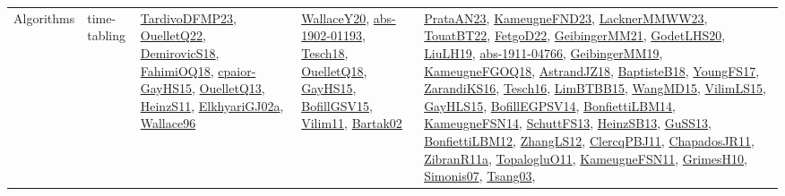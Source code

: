 {\begin{longtable}{lp{3cm}>{\raggedright}p{6cm}>{\raggedright}p{6cm}p{8cm}}
Algorithms & time-tabling & \href{papers/TardivoDFMP23.pdf}{TardivoDFMP23}\cite{TardivoDFMP23}, \href{papers/OuelletQ22.pdf}{OuelletQ22}\cite{OuelletQ22}, \href{papers/DemirovicS18.pdf}{DemirovicS18}\cite{DemirovicS18}, \href{articles/FahimiOQ18.pdf}{FahimiOQ18}\cite{FahimiOQ18}, \href{papers/cpaior-GayHS15.pdf}{cpaior-GayHS15}\cite{cpaior-GayHS15}, \href{papers/OuelletQ13.pdf}{OuelletQ13}\cite{OuelletQ13}, \href{papers/HeinzS11.pdf}{HeinzS11}\cite{HeinzS11}, \href{papers/ElkhyariGJ02a.pdf}{ElkhyariGJ02a}\cite{ElkhyariGJ02a}, \href{articles/Wallace96.pdf}{Wallace96}\cite{Wallace96} & \href{articles/WallaceY20.pdf}{WallaceY20}\cite{WallaceY20}, \href{articles/abs-1902-01193.pdf}{abs-1902-01193}\cite{abs-1902-01193}, \href{papers/Tesch18.pdf}{Tesch18}\cite{Tesch18}, \href{papers/OuelletQ18.pdf}{OuelletQ18}\cite{OuelletQ18}, \href{papers/GayHS15.pdf}{GayHS15}\cite{GayHS15}, \href{papers/BofillGSV15.pdf}{BofillGSV15}\cite{BofillGSV15}, \href{papers/Vilim11.pdf}{Vilim11}\cite{Vilim11}, \href{papers/Bartak02.pdf}{Bartak02}\cite{Bartak02} & \href{articles/PrataAN23.pdf}{PrataAN23}\cite{PrataAN23}, \href{papers/KameugneFND23.pdf}{KameugneFND23}\cite{KameugneFND23}, \href{articles/LacknerMMWW23.pdf}{LacknerMMWW23}\cite{LacknerMMWW23}, \href{papers/TouatBT22.pdf}{TouatBT22}\cite{TouatBT22}, \href{articles/FetgoD22.pdf}{FetgoD22}\cite{FetgoD22}, \href{papers/GeibingerMM21.pdf}{GeibingerMM21}\cite{GeibingerMM21}, \href{papers/GodetLHS20.pdf}{GodetLHS20}\cite{GodetLHS20}, \href{papers/LiuLH19.pdf}{LiuLH19}\cite{LiuLH19}, \href{articles/abs-1911-04766.pdf}{abs-1911-04766}\cite{abs-1911-04766}, \href{papers/GeibingerMM19.pdf}{GeibingerMM19}\cite{GeibingerMM19}, \href{papers/KameugneFGOQ18.pdf}{KameugneFGOQ18}\cite{KameugneFGOQ18}, \href{papers/AstrandJZ18.pdf}{AstrandJZ18}\cite{AstrandJZ18}, \href{articles/BaptisteB18.pdf}{BaptisteB18}\cite{BaptisteB18}, \href{papers/YoungFS17.pdf}{YoungFS17}\cite{YoungFS17}, \href{articles/ZarandiKS16.pdf}{ZarandiKS16}\cite{ZarandiKS16}, \href{papers/Tesch16.pdf}{Tesch16}\cite{Tesch16}, \href{papers/LimBTBB15.pdf}{LimBTBB15}\cite{LimBTBB15}, \href{articles/WangMD15.pdf}{WangMD15}\cite{WangMD15}, \href{papers/VilimLS15.pdf}{VilimLS15}\cite{VilimLS15}, \href{papers/GayHLS15.pdf}{GayHLS15}\cite{GayHLS15}, \href{papers/BofillEGPSV14.pdf}{BofillEGPSV14}\cite{BofillEGPSV14}, \href{articles/BonfiettiLBM14.pdf}{BonfiettiLBM14}\cite{BonfiettiLBM14}, \href{articles/KameugneFSN14.pdf}{KameugneFSN14}\cite{KameugneFSN14}, \href{papers/SchuttFS13.pdf}{SchuttFS13}\cite{SchuttFS13}, \href{articles/HeinzSB13.pdf}{HeinzSB13}\cite{HeinzSB13}, \href{papers/GuSS13.pdf}{GuSS13}\cite{GuSS13}, \href{papers/BonfiettiLBM12.pdf}{BonfiettiLBM12}\cite{BonfiettiLBM12}, \href{papers/ZhangLS12.pdf}{ZhangLS12}\cite{ZhangLS12}, \href{papers/ClercqPBJ11.pdf}{ClercqPBJ11}\cite{ClercqPBJ11}, \href{papers/ChapadosJR11.pdf}{ChapadosJR11}\cite{ChapadosJR11}, \href{papers/ZibranR11a.pdf}{ZibranR11a}\cite{ZibranR11a}, \href{articles/TopalogluO11.pdf}{TopalogluO11}\cite{TopalogluO11}, \href{papers/KameugneFSN11.pdf}{KameugneFSN11}\cite{KameugneFSN11}, \href{papers/GrimesH10.pdf}{GrimesH10}\cite{GrimesH10}, \href{articles/Simonis07.pdf}{Simonis07}\cite{Simonis07}, \href{articles/Tsang03.pdf}{Tsang03}\cite{Tsang03}, 
\end{longtable}}
